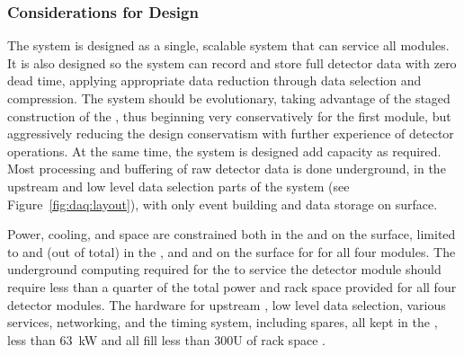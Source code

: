  

\subsubsection{Considerations for Design}
\label{sec:daq:considerations}

The  system is designed as a single, scalable system that can
service all  modules. It is also designed so the
system can record and store full detector data with zero dead
time, applying appropriate data reduction through data selection and
compression. The system should be evolutionary, taking advantage of the
staged construction of the  , thus beginning very
conservatively for the first   module, but aggressively reducing
the design conservatism with further experience of detector
operations. At the same time, the system is designed add capacity as required. Most processing and buffering of raw
detector data is done underground, in the upstream  and low
level data selection parts of the
system (see Figure~\ref{fig:daq:layout}), with only event building and data
storage on surface.

Power, cooling, and space are constrained both in the  and on the surface, limited to \daqpower and \daqracks (out of \cucracks total) in the , and \surfdaqpower and \surfdaqracks on the surface for  for all four  modules.
The underground computing required for the  to service the 
detector module should require less than a quarter of the total power and rack space provided for all four detector modules. 
The hardware for upstream , low level data selection,
various services, networking, and the timing system, including spares,
all kept in the , 
 less than \SI{63}{\kilo\watt} and all fill less
than 300U of rack space \cite{bib:docdb15544}.


